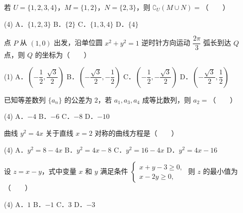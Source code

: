 

\begin{question}
若 $U = \{1, 2, 3, 4\}$，$M = \{1, 2\}$，$N = \{2, 3\}$，则 $\complement_U (M \cup N) =$\mbox{（　　）}

\begin{gkopts}(4)
\task A．$\{1, 2, 3\}$
\task B．$\{2\}$
\task C．$\{1, 3, 4\}$
\task D．$\{4\}$
\end{gkopts}

\end{question}
\begin{question}
点 $P$ 从 $(1, 0)$ 出发，沿单位圆 $x^2 + y^2 = 1$ 逆时针方向运动 $\dfrac{2\pi}{3}$ 弧长到达 $Q$ 点，则 $Q$ 的坐标为\mbox{（　　）}

\begin{gkopts}(1)
\task A．$\left(-\dfrac{1}{2}, \dfrac{\sqrt{3}}{2}\right)$
\task B．$\left(-\dfrac{\sqrt{3}}{2}, -\dfrac{1}{2}\right)$
\task C．$\left(-\dfrac{1}{2}, -\dfrac{\sqrt{3}}{2}\right)$
\task D．$\left(-\dfrac{\sqrt{3}}{2}, \dfrac{1}{2}\right)$
\end{gkopts}

\end{question}
\begin{question}
已知等差数列 $\{a_n\}$ 的公差为 $2$，若 $a_1, a_3, a_4$ 成等比数列，则 $a_2 =$\mbox{（　　）}

\begin{gkopts}(4)
\task A．$-4$
\task B．$-6$
\task C．$-8$
\task D．$-10$
\end{gkopts}

\end{question}
\begin{question}
曲线 $y^2 = 4x$ 关于直线 $x = 2$ 对称的曲线方程是\mbox{（　　）}

\begin{gkopts}(4)
\task A．$y^2 = 8 - 4x$
\task B．$y^2 = 4x - 8$
\task C．$y^2 = 16 - 4x$
\task D．$y^2 = 4x - 16$
\end{gkopts}

\end{question}
\begin{question}
设 $z = x - y$，式中变量 $x$ 和 $y$ 满足条件 $\begin{cases} x + y - 3 \geqslant 0, \\ x - 2y \geqslant 0, \end{cases}$ 则 $z$ 的最小值为\mbox{（　　）}

\begin{gkopts}(4)
\task A．$1$
\task B．$-1$
\task C．$3$
\task D．$-3$
\end{gkopts}

\end{question}

